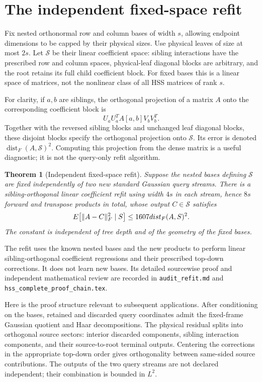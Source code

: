 \documentclass[11pt,oneside,openany,a4paper]{report}
\numberwithin{equation}{chapter}
\newtheorem{theorem}{Theorem}[chapter]
\theoremstyle{definition}
\theoremstyle{remark}
\newcommand{\sourcefile}[1]{{\small\nolinkurl{#1}}}
\begin{document}
\section{The independent fixed-space refit}
\label{sec:route-refit}

Fix nested orthonormal row and column bases of width $s$, allowing
endpoint dimensions to be capped by their physical sizes.  Use physical
leaves of size at most $2s$.  Let $\mathcal S$ be their linear coefficient
space: sibling interactions have the prescribed row and column spaces,
physical-leaf diagonal blocks are arbitrary, and the root retains its
full child coefficient block.  For fixed bases this is a linear space
of matrices, not the nonlinear class of all HSS matrices of rank $s$.

For clarity, if $a,b$ are siblings, the orthogonal projection of a
matrix $A$ onto the corresponding coefficient block is
\[
 U_aU_a^T A[a,b]V_bV_b^T.
\]
Together with the reversed sibling blocks and unchanged leaf diagonal
blocks, these disjoint blocks specify the orthogonal projection onto
$\mathcal S$.  Its error is denoted
$\operatorname{dist}_F(A,\mathcal S)^2$.  Computing this projection from
the dense matrix is a useful diagnostic; it is not the query-only refit
algorithm.

\begin{theorem}[Independent fixed-space refit]
\label{thm:route-refit}
Suppose the nested bases defining $\mathcal S$ are fixed independently
of two new standard Gaussian query streams.  There is a
sibling-orthogonal linear coefficient refit using width $4s$ in each
stream, hence $8s$ forward and transpose products in total, whose output
$C\in\mathcal S$ satisfies
\begin{equation}
 E\bigl[\lVert A-C\rVert_F^2\mid S\bigr]
 \leq1607dist_F(A,S)^2.
 \label{eq:route-refit}
\end{equation}
The constant is independent of tree depth and of the geometry of the
fixed bases.
\end{theorem}

The refit uses the known nested bases and the new products to perform
linear sibling-orthogonal coefficient regressions and their prescribed
top-down corrections.  It does not learn new bases.  Its detailed
sourcewise proof and independent mathematical review are recorded in
\sourcefile{audit_refit.md} and
\sourcefile{hss_complete_proof_chain.tex}.

Here is the proof structure relevant to subsequent applications.  After
conditioning on the bases, retained and discarded query coordinates
admit the fixed-frame Gaussian quotient and Haar decompositions.  The
physical residual splits into orthogonal source sectors: interior
discarded components, sibling interaction components, and their
source-to-root terminal outputs.  Centering the corrections in the
appropriate top-down order gives orthogonality between same-sided
source contributions.  The outputs of the two query streams are not
declared independent; their combination is bounded in $L^2$.
\end{document}
